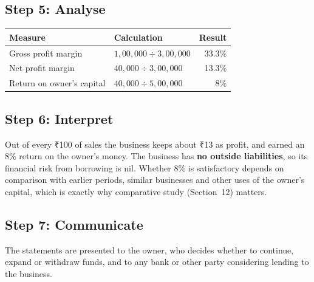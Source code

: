 \documentclass[11pt,a4paper]{article}
\newcommand{\Rs}{{\rsfont ₹}}
\begin{document}
\subsection{Step 5: Analyse}

\begin{center}
\small
\begin{tabularx}{\textwidth}{@{}l Y r@{}}
\toprule
{}\textbf{Measure} & \textbf{Calculation} & \textbf{Result}\\
\midrule
Gross profit margin & $1{,}00{,}000\div 3{,}00{,}000$ & 33.3\%\\
Net profit margin & $40{,}000\div 3{,}00{,}000$ & 13.3\%\\
Return on owner's capital & $40{,}000\div 5{,}00{,}000$ & 8\%\\
\bottomrule
\end{tabularx}
\end{center}

\subsection{Step 6: Interpret}
Out of every \Rs 100 of sales the business keeps about \Rs 13 as profit, and earned an
8\% return on the owner's money. The business has \textbf{no outside liabilities}, so its financial
risk from borrowing is nil. Whether 8\% is satisfactory depends on comparison with earlier
periods, similar businesses and other uses of the owner's capital, which is exactly why
comparative study (Section~12) matters.

\subsection{Step 7: Communicate}
The statements are presented to the owner, who decides whether to continue, expand or withdraw
funds, and to any bank or other party considering lending to the business.
\end{document}
